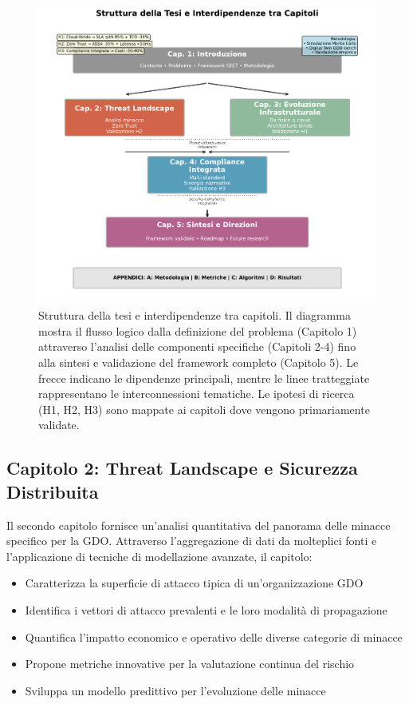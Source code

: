 \begin{bibunit}[IEEEtran]
\begin{figure}[htbp]
\centering
\includegraphics[width=\textwidth]{thesis_figures/cap1/fig_1_4_thesis_structure.pdf}
\caption{Struttura della tesi e interdipendenze tra capitoli. Il diagramma mostra il flusso logico dalla definizione del problema (Capitolo 1) attraverso l'analisi delle componenti specifiche (Capitoli 2-4) fino alla sintesi e validazione del framework completo (Capitolo 5). Le frecce indicano le dipendenze principali, mentre le linee tratteggiate rappresentano le interconnessioni tematiche. Le ipotesi di ricerca (H1, H2, H3) sono mappate ai capitoli dove vengono primariamente validate.}
\label{fig:thesis_structure}
\end{figure}

\subsection{Capitolo 2: Threat Landscape e Sicurezza Distribuita}

Il secondo capitolo fornisce un'analisi quantitativa del panorama delle minacce specifico per la GDO. Attraverso l'aggregazione di dati da molteplici fonti e l'applicazione di tecniche di modellazione avanzate, il capitolo:
\begin{itemize}
\item Caratterizza la superficie di attacco tipica di un'organizzazione GDO
\item Identifica i vettori di attacco prevalenti e le loro modalità di propagazione
\item Quantifica l'impatto economico e operativo delle diverse categorie di minacce
\item Propone metriche innovative per la valutazione continua del rischio
\item Sviluppa un modello predittivo per l'evoluzione delle minacce
\end{itemize}


\end{bibunit}
